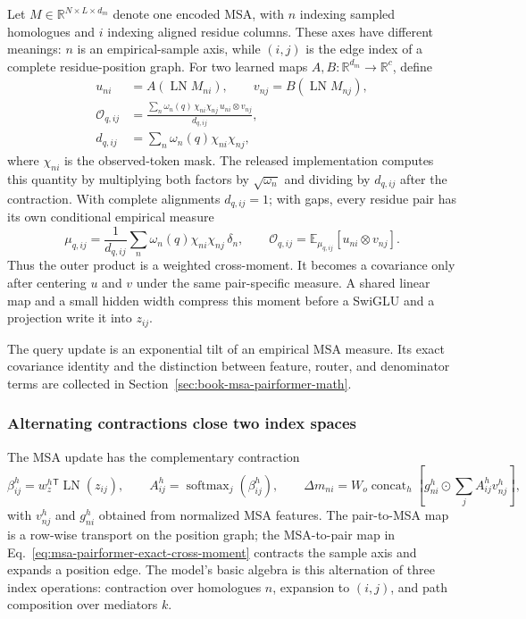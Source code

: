 Let $M\in\mathbb R^{N\times L\times d_m}$ denote one encoded MSA, with $n$ indexing sampled
homologues and $i$ indexing aligned residue columns.  These axes have different meanings: $n$ is
an empirical-sample axis, while $(i,j)$ is the edge index of a complete residue-position graph.
For two learned maps $A,B:\mathbb R^{d_m}\to\mathbb R^{c}$, define
\begin{equation}
\begin{aligned}
u_{ni}&=A(\operatorname{LN}M_{ni}),\qquad
v_{nj}=B(\operatorname{LN}M_{nj}),\\[-2pt]
\mathcal O_{q,ij}
&=\frac{\displaystyle\sum_n\omega_n(q)\,\chi_{ni}\chi_{nj}
        \,u_{ni}\otimes v_{nj}}
       {d_{q,ij}},\\[-2pt]
d_{q,ij}&=\sum_n\omega_n(q)\chi_{ni}\chi_{nj},
\end{aligned}
\label{eq:msa-pairformer-exact-cross-moment}
\end{equation}
where $\chi_{ni}$ is the observed-token mask.  The released implementation computes this
quantity by multiplying both factors by $\sqrt{\omega_n}$ and dividing by $d_{q,ij}$ after the
contraction.  With complete alignments $d_{q,ij}=1$; with gaps, every residue pair has its own
conditional empirical measure
\begin{equation}
\mu_{q,ij}
=\frac1{d_{q,ij}}\sum_n\omega_n(q)\chi_{ni}\chi_{nj}\,\delta_n,
\qquad
\mathcal O_{q,ij}=\mathbb E_{\mu_{q,ij}}[u_{ni}\otimes v_{nj}].
\label{eq:msa-pairformer-pairwise-measure}
\end{equation}
Thus the outer product is a weighted cross-moment.  It becomes a covariance only after centering
$u$ and $v$ under the same pair-specific measure.  A shared linear map and a small hidden width
compress this moment before a SwiGLU and a projection write it into $z_{ij}$.

The query update is an exponential tilt of an empirical MSA measure.  Its exact covariance identity
and the distinction between feature, router, and denominator terms are collected in
Section~\ref{sec:book-msa-pairformer-math}.
\subsubsection{Alternating contractions close two index spaces}

The MSA update has the complementary contraction
\begin{equation}
\beta^h_{ij}=w_z^h{}^{\mathsf T}\operatorname{LN}(z_{ij}),\qquad
A^h_{ij}=\operatorname{softmax}_{j}(\beta^h_{ij}),\qquad
\Delta m_{ni}=W_o\operatorname{concat}_{h}\left[
g^h_{ni}\odot\sum_jA^h_{ij}v^h_{nj}\right],
\label{eq:msa-pairformer-pwa-operator}
\end{equation}
with $v^h_{nj}$ and $g^h_{ni}$ obtained from normalized MSA features.  The pair-to-MSA map is a
row-wise transport on the position graph; the MSA-to-pair map in Eq.~\ref{eq:msa-pairformer-exact-cross-moment}
contracts the sample axis and expands a position edge.  The model's basic algebra is this
alternation of three index operations: contraction over homologues $n$, expansion to $(i,j)$,
and path composition over mediators $k$.

